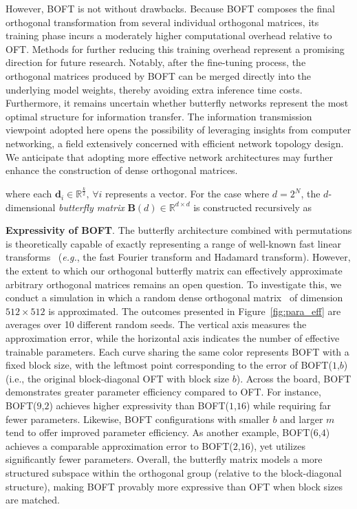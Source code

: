 However, BOFT is not without drawbacks. Because BOFT composes the final orthogonal transformation from several individual orthogonal matrices, its training phase incurs a moderately higher computational overhead relative to OFT. Methods for further reducing this training overhead represent a promising direction for future research. Notably, after the fine-tuning process, the orthogonal matrices produced by BOFT can be merged directly into the underlying model weights, thereby avoiding extra inference time costs. Furthermore, it remains uncertain whether butterfly networks represent the most optimal structure for information transfer. The information transmission viewpoint adopted here opens the possibility of leveraging insights from computer networking, a field extensively concerned with efficient network topology design. We anticipate that adopting more effective network architectures may further enhance the construction of dense orthogonal matrices.

where each $\bm{d}_i \in \mathbb{R}^{\frac{k}{2}},\,\forall i$ represents a vector. For the case where $d=2^N$, the $d$-dimensional \emph{butterfly matrix} $\bm{B}(d) \in \mathbb{R}^{d\times d}$ is constructed recursively as

\textbf{Expressivity of BOFT}. The butterfly architecture combined with permutations is theoretically capable of exactly representing a range of well-known fast linear transforms~\cite{dao2019learning,dao2019kaleidoscope} (\emph{e.g.}, the fast Fourier transform and Hadamard transform). However, the extent to which our orthogonal butterfly matrix can effectively approximate arbitrary orthogonal matrices remains an open question. To investigate this, we conduct a simulation in which a random dense orthogonal matrix~\cite{anderson1987generation} of dimension $512\times 512$ is approximated. The outcomes presented in Figure~\ref{fig:para_eff} are averages over 10 different random seeds. The vertical axis measures the approximation error, while the horizontal axis indicates the number of effective trainable parameters. Each curve sharing the same color represents BOFT with a fixed block size, with the leftmost point corresponding to the error of BOFT($1$,$b$) (i.e., the original block-diagonal OFT with block size $b$). Across the board, BOFT demonstrates greater parameter efficiency compared to OFT. For instance, BOFT($9$,$2$) achieves higher expressivity than BOFT($1$,$16$) while requiring far fewer parameters. Likewise, BOFT configurations with smaller $b$ and larger $m$ tend to offer improved parameter efficiency. As another example, BOFT($6$,$4$) achieves a comparable approximation error to BOFT($2$,$16$), yet utilizes significantly fewer parameters. Overall, the butterfly matrix models a more structured subspace within the orthogonal group (relative to the block-diagonal structure), making BOFT provably more expressive than OFT when block sizes are matched.

